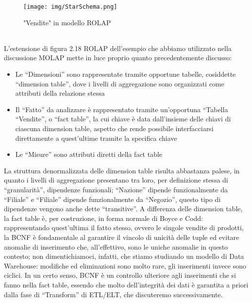 \documentclass[a4paper,12pt]{report}
\begin{document}
\begin{figure}[h]
    \centering
    \texttt{[image: img/StarSchema.png]}
    \caption{"Vendite" in modello ROLAP}
\end{figure}
\\[0ex]
L’estensione di figura 2.18 ROLAP dell’esempio che abbiamo utilizzato nella discussione MOLAP mette in luce proprio quanto precedentemente discusso:
\begin{itemize}
    \item Le “Dimensioni” sono rappresentate tramite opportune tabelle, cosiddette “dimension table”, dove i livelli di aggregazione sono organizzati come attributi della relazione stessa
    \item Il “Fatto” da analizzare è rappresentato tramite un’opportuna “Tabella “Vendite”, o “fact table”, la cui chiave è data dall’insieme delle chiavi di ciascuna dimension table, aspetto che rende possibile interfacciarsi direttamente a quest’ultime tramite la specifica chiave
    \item Le “Misure” sono attributi diretti della fact table
\end{itemize}
La struttura denormalizzata delle dimension table risulta abbastanza palese, in quanto i livelli di aggregazione presentano tra loro, per definizione stessa di “granularità”, dipendenze funzionali; “Nazione” dipende funzionalmente da “Filiale” e “Filiale” dipende funzionalmente da “Negozio”, questo tipo di dipendenze vengono anche dette “transitive”. 
A differenza delle dimension table, la fact table è, per costruzione, in forma normale di Boyce e Codd: rappresentando quest’ultima il fatto stesso, ovvero le singole vendite di prodotti, la BCNF è fondamentale al garantire il vincolo di unicità delle tuple ed evitare anomalie di inserimento che, all’effettivo, sono le uniche anomalie in questo contesto; non dimentichiamoci, infatti, che stiamo studiando un modello di Data Warehouse: modifiche ed eliminazioni sono molto rare, gli inserimenti invece sono ciclici. In un certo senso, BCNF è un controllo ulteriore agli inserimenti che si fanno nella fact table, essendo che molto dell’integrità dei dati è garantita a priori dalla fase di “Transform” di ETL/ELT, che discuteremo successivamente.
\end{document}
